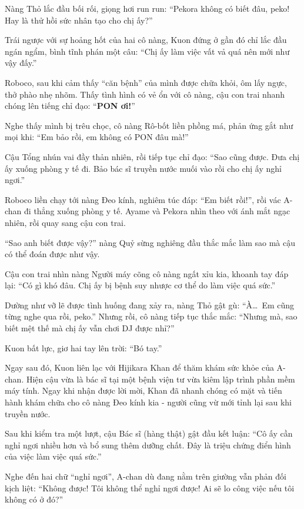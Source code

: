 \documentclass[../main.tex]{subfiles}
\begin{document}
Nàng Thỏ lắc đầu bối rối, giọng hơi run run: ``Pekora không có biết đâu, peko! Hay là thử hồi sức nhân tạo cho chị ấy?''

Trái ngược với sự hoảng hốt của hai cô nàng, Kuon đứng ở gần đó chỉ lắc đầu ngán ngẩm, bình tĩnh phán một câu: ``Chị ấy làm việc vất vả quá nên mới như vậy đấy.''

Roboco, sau khi cảm thấy ``căn bệnh'' của mình được chữa khỏi, ôm lấy ngực, thở phào nhẹ nhõm. Thấy tình hình có vẻ ổn với cô nàng, cậu con trai nhanh chóng lên tiếng chỉ đạo: ``\textbf{PON ơi!}''

Nghe thấy mình bị trêu chọc, cô nàng Rô-bốt liền phồng má, phản ứng gắt như mọi khi: ``Em bảo rồi, em không có PON đâu mà!''

Cậu Tổng nhún vai đầy thản nhiên, rồi tiếp tục chỉ đạo: ``Sao cũng được. Đưa chị ấy xuống phòng y tế đi. Bảo bác sĩ truyền nước muối vào rồi cho chị ấy nghỉ ngơi.''

Roboco liền chạy tới nàng Đeo kính, nghiêm túc đáp: ``Em biết rồi!'', rồi vác A-chan đi thẳng xuống phòng y tế. Ayame và Pekora nhìn theo với ánh mắt ngạc nhiên, rồi quay sang cậu con trai.

``Sao anh biết được vậy?'' nàng Quỷ sừng nghiêng đầu thắc mắc làm sao mà cậu có thể đoán được như vậy.

Cậu con trai nhìn nàng Người máy cõng cô nàng ngất xỉu kia, khoanh tay đáp lại: ``Có gì khó đâu. Chị ấy bị bệnh suy nhược cơ thể do làm việc quá sức.''

Dường như vỡ lẽ được tình huống đang xảy ra, nàng Thỏ gật gù: ``À\dots\ Em cũng từng nghe qua rồi, peko.'' Nhưng rồi, cô nàng tiếp tục thắc mắc: ``Nhưng mà, sao biết mệt thế mà chị ấy vẫn chơi DJ được nhỉ?''

Kuon bất lực, giơ hai tay lên trời: ``Bó tay.''

\ct

Ngay sau đó, Kuon liên lạc với Hijikara Khan để thăm khám sức khỏe của A-chan. Hiện cậu vừa là bác sĩ tại một bệnh viện tư vừa kiêm lập trình phần mềm máy tính. Ngay khi nhận được lời mời, Khan đã nhanh chóng có mặt và tiến hành khám chữa cho cô nàng Đeo kính kia - người cũng vừ mới tỉnh lại sau khi truyền nước.

Sau khi kiểm tra một lượt, cậu Bác sĩ (hàng thật) gật đầu kết luận: ``Cô ấy cần nghỉ ngơi nhiều hơn và bổ sung thêm dưỡng chất. Đây là triệu chứng điển hình của việc làm việc quá sức.''

Nghe đến hai chữ ``nghỉ ngơi'', A-chan dù đang nằm trên giường vẫn phản đối kịch liệt: ``Không được! Tôi không thể nghỉ ngơi được! Ai sẽ lo công việc nếu tôi không có ở đó?''
\end{document}

